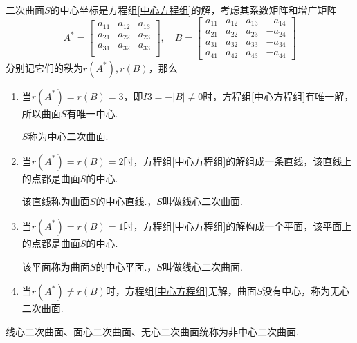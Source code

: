 \theorem[二次曲面中心分类]
二次曲面$S$的中心坐标是方程组\eqref{中心方程组}的解，考虑其系数矩阵和增广矩阵
\begin{equation*}
A^*=
\left[
\begin{array}{ccc}
a_{11} & a_{12} & a_{13}  \\
a_{21} & a_{22} & a_{23}  \\
a_{31} & a_{32} & a_{33}  \\
\end{array}
\right]
,\quad
B = 
\left[
\begin{array}{cccc}
a_{11} & a_{12} & a_{13} & -a_{14} \\
a_{21} & a_{22} & a_{23} & -a_{24} \\
a_{31} & a_{32} & a_{33} & -a_{34} \\
a_{41} & a_{42} & a_{43} & -a_{44}
\end{array}
\right]
\end{equation*}
分别记它们的秩为$r(A^*),r(B)$，那么
\begin{enumerate}
	\setlength{\topsep}{0.01em}
	\setlength{\itemsep}{0.01em}
	\item 当$r(A^*)=r(B)=3$，即$I3=-|B|\ne 0$时，方程组\eqref{中心方程组}有唯一解，所以曲面$S$有唯一中心.
	\par \kg $S$称为{\color{dy}中心二次曲面}.
	\item 当$r(A^*)=r(B)=2$时，方程组\eqref{中心方程组}的解组成一条直线，该直线上的点都是曲面$S$的中心.
	\par \kg 该直线称为曲面$S$的{\color{dy}中心直线}.，$S$叫做{\color{dy}线心二次曲面}.
	\item 当$r(A^*)=r(B)=1$时，方程组\eqref{中心方程组}的解构成一个平面，该平面上的点都是曲面$S$的中心.
	\par \kg 该平面称为曲面$S$的{\color{dy}中心平面}.，$S$叫做{\color{dy}线心二次曲面}.
	\item 当$r(A^*)\ne r(B)$时，方程组\eqref{中心方程组}无解，曲面$S$没有中心，称为{\color{dy}无心二次曲面}.
\end{enumerate}
\par 线心二次曲面、面心二次曲面、无心二次曲面统称为{\color{dy}非中心二次曲面}.


